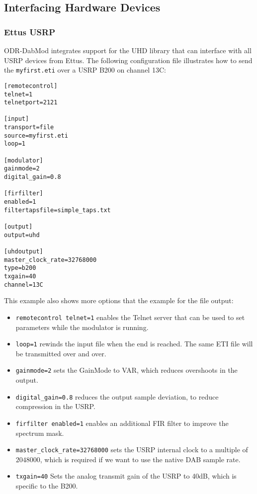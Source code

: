 \subsection{Interfacing Hardware Devices}
\subsubsection{Ettus USRP}
ODR-DabMod integrates support for the UHD library that can interface with all USRP devices from
Ettus. The following configuration file illustrates how to send the \texttt{myfirst.eti} over a USRP
B200 on channel 13C:

\begin{lstlisting}
[remotecontrol]
telnet=1
telnetport=2121

[input]
transport=file
source=myfirst.eti
loop=1

[modulator]
gainmode=2
digital_gain=0.8

[firfilter]
enabled=1
filtertapsfile=simple_taps.txt

[output]
output=uhd

[uhdoutput]
master_clock_rate=32768000
type=b200
txgain=40
channel=13C
\end{lstlisting}

This example also shows more options that the example for the file output:

\begin{itemize}
    \item \texttt{remotecontrol telnet=1} enables the Telnet server that can be used to set
        parameters while the modulator is running.
    \item \texttt{loop=1} rewinds the input file when the end is reached. The same ETI file will be
        transmitted over and over.
    \item \texttt{gainmode=2} sets the GainMode to VAR, which reduces overshoots in the output.
    \item \texttt{digital\_gain=0.8} reduces the output sample deviation, to reduce compression in
        the USRP.
    \item \texttt{firfilter enabled=1} enables an additional FIR filter to improve the spectrum
        mask.
    \item \texttt{master\_clock\_rate=32768000} sets the USRP internal clock to a multiple of
        $2048000$, which is required if we want to use the native DAB sample rate.
    \item \texttt{txgain=40} Sets the analog transmit gain of the USRP to 40dB, which is specific to
        the B200.
\end{itemize}

